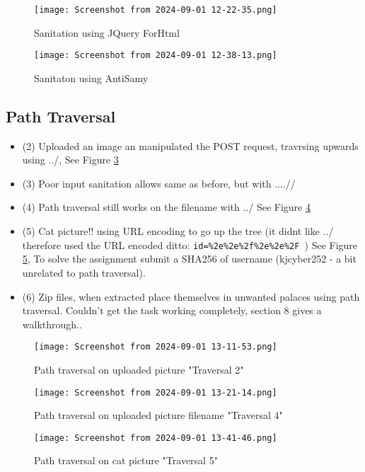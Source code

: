 \documentclass[
	letterpaper, %
	10pt, %
	unnumberedsections, %
	twoside, %
]{APAAssignment}
\begin{document}
\begin{appendices}
\begin{figure}[!htb] %
	\centering
	\texttt{[image: Screenshot from 2024-09-01 12-22-35.png]}
	\caption{Sanitation using JQuery ForHtml}
	\label{fig:ForHtml}
\end{figure}


\begin{figure}[!htb] %
	\centering
	\texttt{[image: Screenshot from 2024-09-01 12-38-13.png]}
	\caption{Sanitaton using AntiSamy}
	\label{fig:AntiSamy}
\end{figure}

\subsection{Path Traversal}\label{path-traversal}

\begin{itemize}
	\item (2) Uploaded an image an manipulated the POST request, travrsing upwards using ../, See Figure \ref{fig:Traversal2}
	\item (3) Poor input sanitation allows same as before, but with ....//
	\item (4) Path traversal still works on the filename with ../ See Figure \ref{fig:Traversal4}
	\item (5) Cat picture!! using URL encoding to go up the tree (it didnt like ../ therefore used the URL encoded ditto:  \verb $id=%2e%2e%2f%2e%2e%2F $) See Figure \ref{fig:Traversal5}, To solve the assignment submit a SHA256 of username (kjcyber252 - a bit unrelated to path traversal).
	\item (6) Zip files, when extracted place themselves in unwanted palaces using path traversal. Couldn't get the task working completely, section 8 gives a walkthrough..   
\end{itemize}






\begin{figure}[!htb] %
	\centering
	\texttt{[image: Screenshot from 2024-09-01 13-11-53.png]}
	\caption{Path traversal on uploaded picture "Traversal 2"}
	\label{fig:Traversal2}
\end{figure}


\begin{figure}[!htb] %
	\centering
	\texttt{[image: Screenshot from 2024-09-01 13-21-14.png]}
	\caption{Path traversal on uploaded picture filename "Traversal 4"}
	\label{fig:Traversal4}
\end{figure}

\begin{figure}[!htb] %
	\centering
	\texttt{[image: Screenshot from 2024-09-01 13-41-46.png]}
	\caption{Path traversal on cat picture "Traversal 5"}
	\label{fig:Traversal5}
\end{figure}



\end{appendices}
\end{document}
